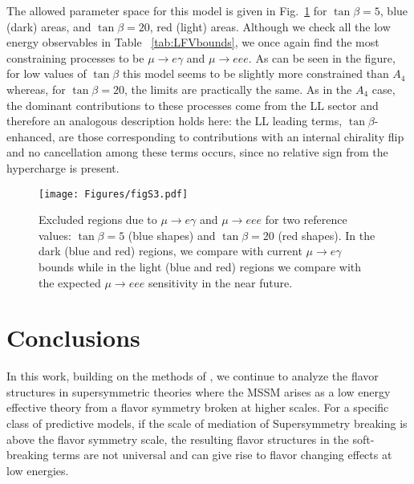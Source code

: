 \documentclass[a4paper,11pt]{article}
\begin{document}
The allowed parameter space for this model is given in Fig.~\ref{fig:S3current} for $\tan\beta=5$, blue (dark) areas, and $\tan\beta=20$, red (light) areas. Although we check all the low energy observables in Table~ \ref{tab:LFVbounds}, we once again find the most constraining processes to be $\mu \to e\gamma$ and $\mu \to e e e$. As can be seen in the figure, for low values of $\tan\beta$ this model seems to be slightly more constrained than $A_4$ whereas, for $\tan\beta=20$, the limits are practically the same. As in the $A_4$ case, the dominant contributions to these processes come from the LL sector and therefore an analogous description holds here: the LL leading terms, $\tan\beta$-enhanced, are those corresponding to contributions with an internal chirality flip and no cancellation among these terms occurs, since no relative sign from the hypercharge is present.
\\
\begin{figure}[h!]
  \centering
  \captionsetup{width=.9\linewidth}
  \vspace{-0.75cm}
  \texttt{[image: Figures/figS3.pdf]}
  \caption{Excluded regions due to $\mu \to e \gamma$  and $\mu\to eee$ for two reference values: $\tan\beta = 5$ (blue shapes)
and $\tan \beta = 20$ (red shapes). In the dark (blue and red) regions, we compare with current $\mu \to e \gamma$  bounds
while in the light (blue and red) regions we compare with the expected $\mu\to eee$ sensitivity in the near future.}
  \label{fig:S3current}
\end{figure}



\section{Conclusions} \label{conclusions}

In this work, building on the methods of \cite{Das:2016czs}, we continue to analyze the flavor structures in supersymmetric theories where the MSSM arises as a low energy effective theory from a flavor symmetry broken at higher scales. For a specific class of predictive models, if the scale of mediation of Supersymmetry breaking is above the flavor symmetry scale, the resulting flavor structures in the soft-breaking terms are not universal and can give rise to flavor changing effects at low energies.
\end{document}
